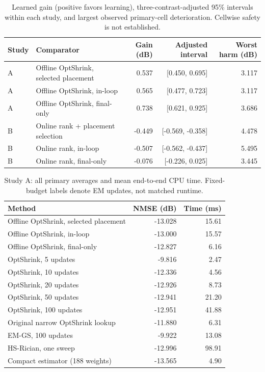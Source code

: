 \begin{table}[!t]
\caption{Learned gain (positive favors learning), three-contrast-adjusted 95\% intervals within each study, and largest observed primary-cell deterioration. Cellwise safety is not established.}
\label{tab:broad-ci}\centering\footnotesize
\setlength{\tabcolsep}{4pt}
\begin{tabular}{@{}llrrr@{}}\toprule
Study & Comparator & Gain (dB) & Adjusted interval & Worst harm (dB)\\
\midrule
A & Offline OptShrink, selected placement & 0.537 & [0.450, 0.695] & 3.117\\
A & Offline OptShrink, in-loop & 0.565 & [0.477, 0.723] & 3.117\\
A & Offline OptShrink, final-only & 0.738 & [0.621, 0.925] & 3.686\\
B & Online rank + placement selection & -0.449 & [-0.569, -0.358] & 4.478\\
B & Online rank, in-loop & -0.507 & [-0.562, -0.437] & 5.495\\
B & Online rank, final-only & -0.076 & [-0.226, 0.025] & 3.445\\
\bottomrule
\end{tabular}
\end{table}


\begin{table}[!t]
\caption{Study A: all primary averages and mean end-to-end CPU time. Fixed-budget labels denote EM updates, not matched runtime.}
\label{tab:all-A}\centering\footnotesize
\setlength{\tabcolsep}{4pt}
\begin{tabular}{@{}lrr@{}}\toprule
Method & NMSE (dB) & Time (ms)\\
\midrule
Offline OptShrink, selected placement & -13.028 & 15.61\\
Offline OptShrink, in-loop & -13.000 & 15.57\\
Offline OptShrink, final-only & -12.827 & 6.16\\
OptShrink, 5 updates & -9.816 & 2.47\\
OptShrink, 10 updates & -12.336 & 4.56\\
OptShrink, 20 updates & -12.926 & 8.73\\
OptShrink, 50 updates & -12.941 & 21.20\\
OptShrink, 100 updates & -12.951 & 41.88\\
Original narrow OptShrink lookup & -11.880 & 6.31\\
EM-GS, 100 updates & -9.922 & 13.08\\
HS-Rician, one sweep & -12.996 & 98.91\\
Compact estimator (188 weights) & -13.565 & 4.90\\
\bottomrule
\end{tabular}
\end{table}



